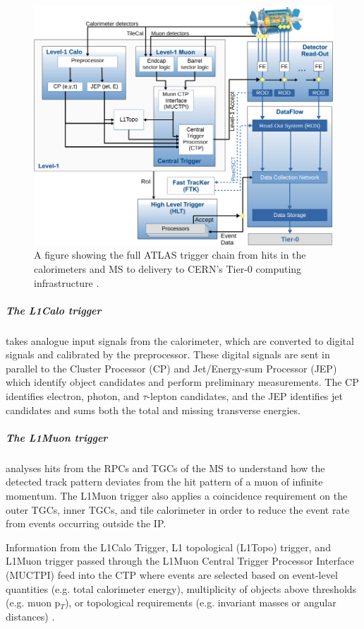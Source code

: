 \documentclass[12pt,a4paper,epsf,portrait,times,epsfig]{report}
\begin{document}
		\begin{figure}
			\centering
			\includegraphics[scale=0.4]{ATLAS_Trigger_Flowchart}
			\caption{A figure showing the full ATLAS trigger chain from hits in the calorimeters and MS to delivery to CERN's Tier-0 computing infrastructure \cite{ATLASTrigger}.}
			\label{Fig:ATLASTriggerChain}
		\end{figure}
		
		\subparagraph{The L1Calo trigger} takes analogue input signals from the calorimeter, which are converted to digital signals and calibrated by the preprocessor. These digital signals are sent in parallel to the Cluster Processor (CP) and Jet/Energy-sum Processor (JEP) which identify object candidates and perform preliminary measurements. The CP identifies electron, photon, and $\tau$-lepton candidates, and the JEP identifies jet candidates and sums both the total and missing transverse energies. \par

		\subparagraph{The L1Muon trigger} analyses hits from the RPCs and TGCs of the MS to understand how the detected track pattern deviates from the hit pattern of a muon of infinite momentum.  The L1Muon trigger also applies a coincidence requirement on the outer TGCs, inner TGCs, and tile calorimeter in order to reduce the event rate from events occurring outside the IP. \par

		Information from the L1Calo Trigger, L1 topological (L1Topo) trigger, and L1Muon trigger passed through the L1Muon Central Trigger Processor Interface (MUCTPI) feed into the CTP where events are selected based on event-level quantities (e.g. total calorimeter energy), multiplicity of objects above thresholds (e.g. muon p$_{T}$), or topological requirements (e.g. invariant masses or angular distances) \cite{ATLASTrigger}. 
		
\end{document}
